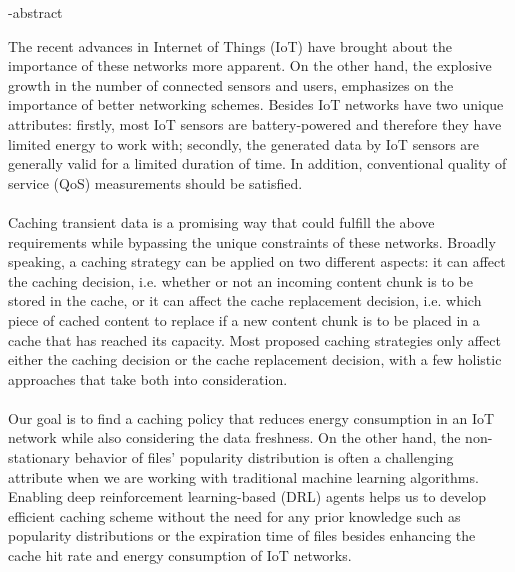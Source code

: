 
\en-abstract{
The recent advances in Internet of Things (IoT) have brought about the importance of these networks more apparent. On the other hand, the explosive growth in the number of connected sensors and users, emphasizes on the importance of better networking schemes. Besides IoT networks have two unique attributes:
firstly, most IoT sensors are battery-powered and therefore they have limited energy to work with; secondly, the generated data by IoT sensors are generally valid for a limited duration
of time. In addition, conventional quality of service (QoS) measurements should be satisfied.
\paragraph{}
Caching transient data is a promising way that could fulfill the above requirements while bypassing the unique constraints of these networks.
Broadly speaking, a caching strategy can be applied on two different aspects:
it can affect the caching decision, i.e. whether or not an incoming content
chunk is to be stored in the cache, or it can affect the cache replacement decision, i.e. which piece of cached content to replace if a new content chunk is to be placed in a cache that has
reached its capacity.
Most proposed caching strategies only affect either the caching decision or the
cache replacement decision, with a few holistic approaches that take both into
consideration.
\paragraph{}
Our goal is to find a caching policy that reduces energy consumption in an IoT network while also considering the data freshness. On the other hand, the non-stationary behavior of files' popularity distribution is often a challenging attribute when we are working with traditional machine learning algorithms. Enabling deep reinforcement learning-based (DRL) agents helps us to develop efficient caching scheme without the need for any prior knowledge such as popularity distributions or the expiration time of files besides enhancing the cache hit rate and energy consumption of IoT networks.
}
